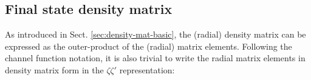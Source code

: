 \subsection{Final state density matrix\label{sec:density-mat-full}}







As introduced in Sect. \ref{sec:density-mat-basic}, the (radial) density matrix can be expressed as the outer-product of the (radial) matrix elements. Following the channel function notation, it is also trivial to write the radial matrix elements in density matrix form in the $\zeta\zeta'$ representation:

